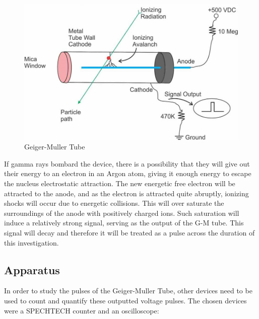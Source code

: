 \documentclass[a4paper]{article}
\begin{document}
  \begin{figure}[h]
  \includegraphics[scale=0.8]{geiger-muller.jpg} 
  \centering
  \caption{Geiger-Muller Tube}
  \end{figure}
  
  If gamma rays bombard the device, there is a possibility that they will give out their energy to an electron in an Argon atom, giving it enough energy to escape the nucleus electrostatic attraction. The new energetic free electron will be attracted to the anode, and as the electron is attracted quite abruptly, ionizing shocks will occur due to energetic collisions. This will over saturate the surroundings of the anode with positively charged ions. Such saturation will induce a relatively strong signal, serving as the output of the G-M tube. This signal will decay and therefore it will be treated as a pulse across the duration of this investigation.
  
  \subsection{Apparatus}
  In order to study the pulses of the Geiger-Muller Tube, other devices need to be used to count and quantify these outputted voltage pulses. The chosen devices were a SPECHTECH counter and an oscilloscope:  
  
\end{document}
